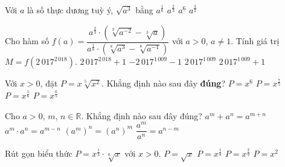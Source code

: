 \begin{ex}%
	 Với $a$ là số thực dương tuỳ ý, $\sqrt{a^3}$ bằng
	 \choice
		{$a^{\tfrac{1}{6}}$} 
		{$a^{\tfrac{2}{3}}$} 
		{$a^6$} 
		{\True $a^{\tfrac{3}{2}}$} 
\end{ex}

\begin{ex}%
	Cho hàm số $f(a)=\dfrac{a^{\tfrac{2}{3}}\cdot\left(\sqrt[3]{a^{-2}}-\sqrt[3]{a}\right)}{a^{\tfrac{1}{8}}\cdot\left(\sqrt[8]{a^3}-\sqrt[8]{a^{-1}}\right)}$ với $a>0$, $a\neq 1$. Tính giá trị  $M=f\left(2\,017^{2\,018}\right)$.
	 \choice
		{$2\,017^{2\,018}+1$} 
		{\True $-2\,017^{1\,009}-1$} 
		{$2\,017^{1\,009}$} 
		{$2\,017^{1\,009}+1$} 
\end{ex}

\begin{ex}%
	Với $x>0$, đặt $P=x\sqrt[5]{x^2}$. Khẳng định nào sau đây  {\bf đúng}?
	 \choice
		{$P=x^6$} 
		 {\True $P=x^{\frac{7}{5}}$}
		{$P=x^{\frac{5}{6}}$} 
		{$P=x^{\frac{6}{5}}$} 
\end{ex}

\begin{ex}%
	Cho $a>0$, $m$, $n\in \mathbb{R}$. Khẳng định nào  sau đây đúng?
	\choice 
		 {$a^m+a^n=a^{m+n}$}
		{$a^m\cdot  a^n=a^{m-n}$}
		{\True $(a^m)^n=(a^n)^m$} 
		 {$\dfrac{a^m}{a^n}=a^{n-m}$}
\end{ex}

\begin{ex}%
	Rút gọn biểu  thức $P=x^{\frac{1}{3}}\cdot\sqrt[6]x$ với $x>0$.
	 \choice
		{\True  $P=\sqrt{x}$}
		 {$P=x^{\frac{1}{8}}$}
		 {$P=x^{\frac{2}{9}}$}
		{$P=x^2$} 
\end{ex}


